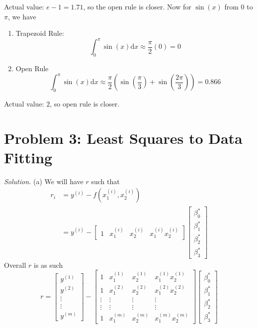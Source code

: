 \documentclass{article}
\begin{document}
Actual value: $e - 1 = 1.71$, so the open rule is closer. Now for $\sin(x)$ from $0$ to $\pi$, we have
\begin{enumerate}
    \item Trapezoid Rule:
    \begin{equation*}
    \int_{0}^{\pi}\sin(x)\text{d}x \approx \frac{\pi}{2}(0) = 0
\end{equation*}
    \item Open Rule
    \begin{equation*}
        \int_{0}^{\pi}\sin(x)\text{d}x \approx \frac{\pi}{2}\left(\sin\left(\frac{\pi}{3}\right) + \sin\left(\frac{2\pi}{3}\right)\right) = 0.866
    \end{equation*}
\end{enumerate}
Actual value: $2$, so open rule is closer.
\section*{Problem 3: Least Squares to Data Fitting}
\emph{Solution. }(a) We will have $r$ such that \begin{equation*}
\begin{aligned}
r_i & =y^{(i)}-f\left(x_1^{(i)}, x_2^{(i)}\right) \\
& =y^{(i)}-\left[\begin{array}{llll}
1 & x_1^{(i)} & x_2^{(i)} & x_1^{(i)} x_2^{(i)}
\end{array}\right]\left[\begin{array}{c}
\beta_0^* \\
\beta_1^* \\
\beta_2^* \\
\beta_3^*
\end{array}\right]
\end{aligned}
\end{equation*}
Overall $r$ is as such
\begin{equation*}
r=\left[\begin{array}{c}
y^{(1)} \\
y^{(2)} \\
\vdots \\
\vdots \\
y^{(m)}
\end{array}\right]-\left[\begin{array}{cccc}
1 & x_1^{(1)} & x_2^{(1)} & x_1^{(1)} x_2^{(1)} \\
1 & x_1^{(2)} & x_2^{(2)} & x_1^{(2)} x_2^{(2)} \\
\vdots & \vdots & \vdots & \vdots \\
\vdots & \vdots & \vdots & \vdots \\
1 & x_1^{(m)} & x_2^{(m)} & x_1^{(m)} x_2^{(m)}
\end{array}\right]\left[\begin{array}{c} 
\beta_0^* \\
\beta_1^* \\
\beta_2^* \\
\beta_3^*
\end{array}\right]
\end{equation*}
\end{document}
